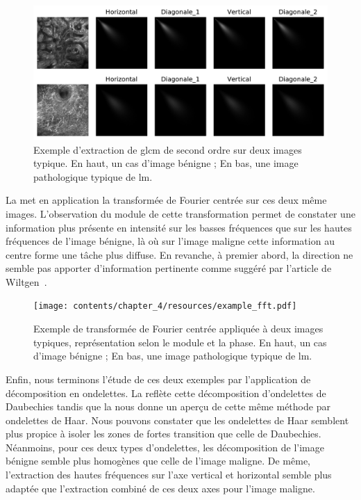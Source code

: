 \begin{figure}[H]
    \centering
    \includegraphics[width=\linewidth]{contents/chapter_4/resources/example_glcm.pdf}
    \caption{Exemple d'extraction de \gls{glcm} de second ordre sur deux images typique. En haut, un cas d'image bénigne ; En bas, une image pathologique typique de \gls{lm}.}
    \label{fig:example_glcm}
\end{figure}\par

La  met en application la transformée de Fourier centrée sur ces deux même images. L'observation du module de cette transformation permet de constater une information plus présente en intensité sur les basses fréquences que sur les hautes fréquences de l'image bénigne, là où sur l'image maligne cette information au centre forme une tâche plus diffuse. En revanche, à premier abord, la direction ne semble pas apporter d'information pertinente comme suggéré par l'article de Wiltgen~\cite{Wiltgen2008}.\par

\begin{figure}[H]
    \centering
    \texttt{[image: contents/chapter\_4/resources/example\_fft.pdf]}
    \caption{Exemple de transformée de Fourier centrée appliquée à deux images typiques, représentation selon le module et la phase. En haut, un cas d'image bénigne ; En bas, une image pathologique typique de \gls{lm}.}
    \label{fig:example_fft}
\end{figure}\par

Enfin, nous terminons l'étude de ces deux exemples par l'application de décomposition en ondelettes. La  reflète cette décomposition d'ondelettes de Daubechies tandis que la  nous donne un aperçu de cette même méthode par ondelettes de Haar. Nous pouvons constater que les ondelettes de Haar semblent plus propice à isoler les zones de fortes transition que celle de Daubechies. Néanmoins, pour ces deux types d'ondelettes, les décomposition de l'image bénigne semble plus homogènes que celle de l'image maligne. De même, l'extraction des hautes fréquences sur l'axe vertical et horizontal semble plus adaptée que l'extraction combiné de ces deux axes pour l'image maligne.\par

